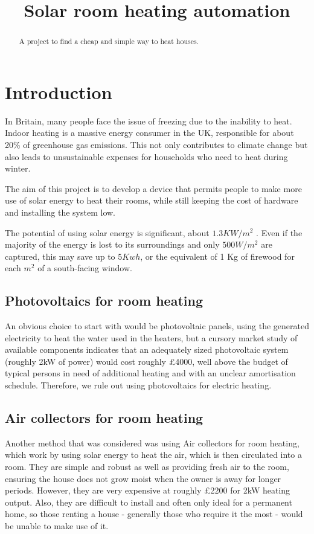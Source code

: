 \documentclass[a4paper,12pt]{article}
\title{Solar room heating automation}
\begin{document}
\maketitle
\begin{abstract}
    A project to find a cheap and simple way to heat houses.
\end{abstract}
\tableofcontents
\section{Introduction}

In Britain, many people face the issue of freezing due to the inability to heat. 
Indoor heating is a massive energy consumer in the UK, responsible for about 20\% of greenhouse gas emissions\cite{url:energyUse}. 
This not only contributes to climate change but also leads to unsustainable expenses for households who need to heat during winter.

The aim of this project is to develop a device that permits people to make more use of solar energy to heat their rooms, 
while still keeping the cost of hardware and installing the system low. 

The potential of using solar energy is significant, about $1.3 KW/m^2$ \cite{url:solarConstant}. 
Even if the majority of the energy is lost to its surroundings and only $500 W/m^2$ are captured, 
this may save up to $5 Kwh$, or the equivalent of 1 Kg of firewood for each $m^2$ of a south-facing window. 

\subsection{Photovoltaics for room heating}

An obvious choice to start with would be photovoltaic panels, using the generated electricity to heat the water used in the heaters, 
but a cursory market study of available components indicates that an adequately sized photovoltaic system (roughly 2kW of power) 
would cost roughly £4000\cite{url:solarEnergyStore}, well above the budget of typical persons in need of additional heating  
and with an unclear amortisation schedule. 
Therefore, we rule out using photovoltaics for electric heating.

\subsection{Air collectors for room heating}

Another method that was considered was using Air collectors for room heating, which work by using solar energy to heat the air, which is then circulated into a room. 
They are simple and robust as well as providing fresh air to the room, ensuring the house does not grow moist when the owner is away for longer periods. 
However, they are very expensive at roughly £2200 for 2kW heating output\cite{url:solarVenti}. Also, they are difficult to install and often only ideal for a permanent home, 
so those renting a house - generally those who require it the most - would be unable to make use of it.
\end{document}
